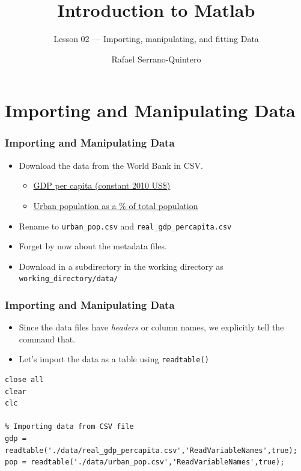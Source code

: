 \documentclass[11pt,xcolor={svgnames},aspectratio=169,usepdftitle=false]{beamer}
\title{Introduction to Matlab}
\subtitle{Lesson 02 --- Importing, manipulating, and fitting Data}
\author{Rafael Serrano-Quintero}
\institute{Department of Economics \\ University of Barcelona}
\date{}
\begin{document}
\VerbatimFootnotes

\maketitle

\section{Importing and Manipulating Data}

\begin{frame}[fragile]
    \frametitle{Importing and Manipulating Data}
\begin{itemize}
    \item Download the data from the World Bank in CSV.
    \begin{itemize}
        \item \href{https://data.worldbank.org/indicator/NY.GDP.PCAP.KD}{GDP per capita (constant 2010 US\$)}
        \item \href{https://data.worldbank.org/indicator/SP.URB.TOTL.IN.ZS}{Urban population as a \% of total population}
    \end{itemize}
    \item Rename to \verb;urban_pop.csv; and \verb;real_gdp_percapita.csv;
    \item Forget by now about the metadata files.
    \item Download in a subdirectory in the working directory as \verb;working_directory/data/;
\end{itemize}
\end{frame}

\begin{frame}[fragile]
  \frametitle{Importing and Manipulating Data}
\begin{itemize}
  \item Since the data files have \textit{headers} or column names, we explicitly tell the command that.
  \item Let's import the data as a table using \verb;readtable();
\end{itemize}
\begin{lstlisting}
close all
clear
clc

% Importing data from CSV file
gdp = readtable('./data/real_gdp_percapita.csv','ReadVariableNames',true);
pop = readtable('./data/urban_pop.csv','ReadVariableNames',true);  
\end{lstlisting}
\end{frame}
\end{document}
